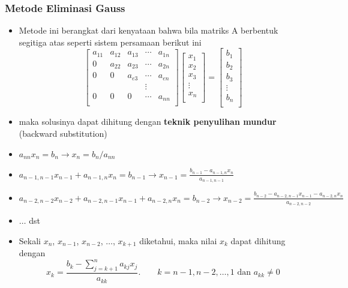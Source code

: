 \documentclass[pdflatex,compress,mathserif]{beamer}
\begin{document}
\begin{frame}
	\frametitle{Metode Eliminasi Gauss}
	\begin{itemize}
		\item Metode ini berangkat dari kenyataan bahwa bila matriks A berbentuk segitiga atas seperti sistem persamaan berikut ini
		\begin{equation*}
			\begin{bmatrix}
				a_{11} & a_{12} & a_{13} & \cdots & a_{1n}\\
				0 & a_{22} & a_{23} & \cdots & a_{2n}\\
				0 & 0 & a_{e3} & \cdots & a_{en}\\
				& & & \vdots & \\
				0 & 0 & 0 & \cdots & a_{nn}\\
			\end{bmatrix}
			\begin{bmatrix}
			x_1\\
			x_2\\
			x_3\\
			\vdots\\
			x_n\\
			\end{bmatrix}
			=
			\begin{bmatrix}
			b_1\\
			b_2\\
			b_3\\
			\vdots\\
			b_n\\
			\end{bmatrix}
		\end{equation*}
		\item maka solusinya dapat dihitung dengan \textbf{teknik penyulihan
		mundur} (backward substitution)
	\end{itemize}
\end{frame}

\begin{frame}
	\begin{itemize}
		\item[] $ a_{nn}x_n = b_n \rightarrow x_n = b_n / a_{nn} $
		\item[] $ a_{n-1,n-1}x_{n-1} + a_{n-1,n}x_{n} = b_{n-1} \rightarrow x_{n-1} = \frac{b_{n-1} - a_{n-1,n}x_n}{a_{n-1,n-1}}$
		\item[] $ a_{n-2,n-2}x_{n-2} + a_{n-2,n-1}x_{n-1} + a_{n-2,n}x_{n} = b_{n-2} \rightarrow x_{n-2} = \frac{b_{n-2} - a_{n-2,n-1}x_{n-1} - a_{n-2,n}x_{n}}{a_{n-2,n-2}}$
		\item[] $\dots$ dst
		\item Sekali $ x_n $, $ x_{n-1} $, $ x_{n-2} $, $\dots$, $ x_{k+1} $ diketahui, maka nilai $ x_k $ dapat dihitung dengan
		\[ x_k = \frac{b_k - \sum_{j=k+1}^{n}a_{kj}x_j}{a_{kk}}.\qquad k=n-1, n-2, \dots, 1 \text{ dan } a_{kk} \neq 0 \]
	\end{itemize}
\end{frame}
\end{document}
